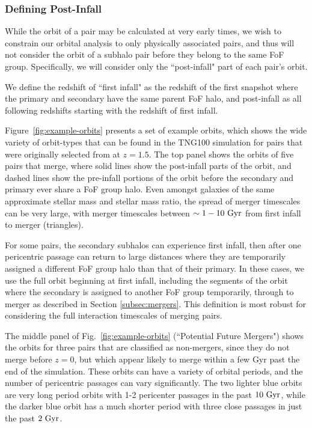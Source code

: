 \documentclass[twocolumn,linenumbers]{aastex631}
\newcommand{\chambe}{\citet{Chamberlain2024}}
\begin{document}
\subsubsection{Defining Post-Infall}
While the orbit of a pair may be calculated at very early times, we wish to constrain our orbital analysis to only physically associated pairs, and thus will not consider the orbit of a subhalo pair before they belong to the same FoF group. 
Specifically, we will consider only the ``post-infall" part of each pair's orbit. 

We define the redshift of ``first infall" as the redshift of the first snapshot where the primary and secondary have the same parent FoF halo, and post-infall as all following redshifts starting with the redshift of first infall. 

Figure~\ref{fig:example-orbits} presents a set of example orbits, which shows the wide variety of orbit-types that can be found in the TNG100 simulation for pairs that were originally selected from \chambe{} at $z=1.5$. 
The top panel shows the orbits of five pairs that merge, where solid lines show the post-infall parts of the orbit, and dashed lines show the pre-infall portions of the orbit before the secondary and primary ever share a FoF group halo. 
Even amongst galaxies of the same approximate stellar mass and stellar mass ratio, the spread of merger timescales can be very large, with merger timescales between $\sim1-10\,\mathrm{\,Gyr}$ from first infall to merger (triangles). 

For some pairs, the secondary subhalos can experience first infall, then after one pericentric passage can return to large distances where they are temporarily assigned a different FoF group halo than that of their primary. 
In these cases, we use the full orbit beginning at first infall, including the segments of the orbit where the secondary is assigned to another FoF group temporarily,  through to merger as described in Section \ref{subsec:mergers}.
This definition is most robust for considering the full interaction timescales of merging pairs.

The middle panel of Fig.~\ref{fig:example-orbits} (``Potential Future Mergers") shows the orbits for three pairs that are classified as non-mergers, since they do not merge before $z=0$, but which appear likely to merge within a few Gyr past the end of the simulation. 
These orbits can have a variety of orbital periods, and the number of pericentric passages can vary significantly. 
The two lighter blue orbits are very long period orbits with 1-2 pericenter passages in the past $10\,\mathrm{\,Gyr}$, while the darker blue orbit has a much shorter period with three close passages in just the past $2\,\mathrm{\,Gyr}$.
\end{document}
